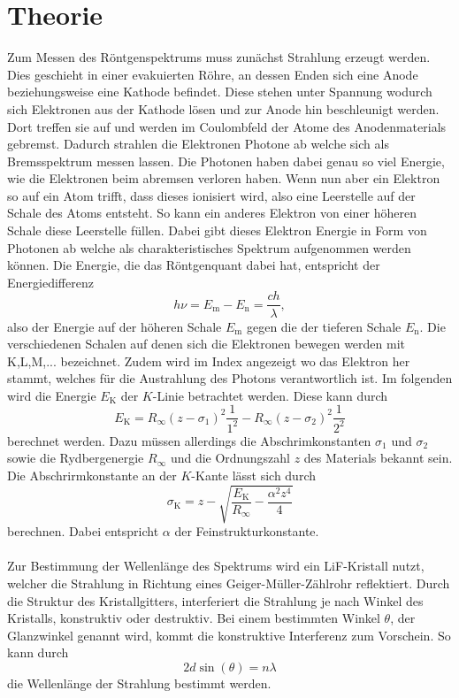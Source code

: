 \section{Theorie}
\label{sec:Theorie}

Zum Messen des Röntgenspektrums muss zunächst Strahlung erzeugt werden.
Dies geschieht in einer evakuierten Röhre, an dessen Enden sich eine Anode beziehungsweise eine Kathode befindet.
Diese stehen unter Spannung wodurch sich Elektronen aus der Kathode lösen und zur Anode hin beschleunigt werden.
Dort treffen sie auf und werden im Coulombfeld der Atome des Anodenmaterials gebremst.
Dadurch strahlen die Elektronen Photone ab welche sich als Bremsspektrum messen lassen.
Die Photonen haben dabei genau so viel Energie, wie die Elektronen beim abremsen verloren haben.
Wenn nun aber ein Elektron so auf ein Atom trifft, dass dieses ionisiert wird, also eine Leerstelle auf der Schale des Atoms entsteht.
So kann ein anderes Elektron von einer höheren Schale diese Leerstelle füllen.
Dabei gibt dieses Elektron Energie in Form von Photonen ab welche als charakteristisches Spektrum aufgenommen werden können.
Die Energie, die das Röntgenquant dabei hat, entspricht der Energiedifferenz 
\begin{equation}
    h \nu = E_ \text{m} - E_ \text{n} = \frac{ch}{\lambda},
    \label{eq:eng}
\end{equation}
also der Energie auf der höheren Schale $E_ \text{m}$ gegen die der tieferen Schale $E_\text{n}$.
Die verschiedenen Schalen auf denen sich die Elektronen bewegen werden mit K,L,M,... bezeichnet.
Zudem wird im Index angezeigt wo das Elektron her stammt, welches für die Austrahlung des Photons verantwortlich ist.
Im folgenden wird die Energie $E_ \text{K}$ der $K$-Linie betrachtet werden.
Diese kann durch 
\begin{equation}
    E_ \text{K} = R_ \infty (z - \sigma_1)^2 \frac{1}{1^2} - R_ \infty (z-\sigma_2)^2 \frac{1}{2^2}
    \label{eq:enkkante}
\end{equation}
berechnet werden.
Dazu müssen allerdings die Abschrimkonstanten $\sigma_1 $ und $\sigma_2$ sowie die Rydbergenergie $R_\infty$ und die Ordnungszahl $z$ des Materials bekannt sein.
Die Abschrirmkonstante an der $K$-Kante lässt sich durch 
\begin{equation}
    \sigma_ \text{K} = z - \sqrt{\frac{E_\text{K}}{R_\infty} - \frac{\alpha^2 z^4}{4}}
    \label{eq:sigma}
\end{equation}
berechnen.
Dabei entspricht $\alpha$ der Feinstrukturkonstante.
\\\\
Zur Bestimmung der Wellenlänge des Spektrums wird ein LiF-Kristall nutzt, welcher die Strahlung in Richtung eines Geiger-Müller-Zählrohr reflektiert.
Durch die Struktur des Kristallgitters, interferiert die Strahlung je nach Winkel des Kristalls, konstruktiv oder destruktiv.
Bei einem bestimmten Winkel $\theta$, der Glanzwinkel genannt wird, kommt die konstruktive Interferenz zum Vorschein.
So kann durch
\begin{equation}
    2d\sin(\theta) = n \lambda
    \label{eq:bragg}
\end{equation}
die Wellenlänge der Strahlung bestimmt werden.

